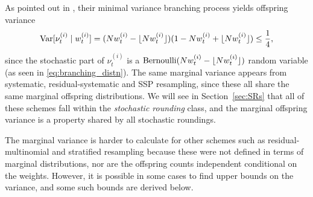 As pointed out in \textcite[p.557]{crisan1999}, their minimal variance branching process yields offspring variance
\begin{equation*}
\operatorname{Var}[ \nu_t^{(i)} \mid w_t^{(i)} ]
= ( Nw_t^{(i)} -\lfloor N w_t^{(i)} \rfloor )(1- Nw_t^{(i)} + \lfloor N w_t^{(i)} \rfloor) 
\leq \frac{1}{4} ,
\end{equation*}
since the stochastic part of $\nu_t^{(i)}$ is a $\operatorname{Bernoulli}( Nw_t^{(i)} -\lfloor N w_t^{(i)} \rfloor )$ random variable (as seen in \eqref{eq:branching_distn}).
The same marginal variance appears from systematic, residual-systematic and SSP resampling, since these all share the same marginal offspring distributions. We will see in Section~\ref{sec:SRs} that all of these schemes fall within the \emph{stochastic rounding} class, and the marginal offspring variance is a property shared by all stochastic roundings.

The marginal variance is harder to calculate for other schemes such as residual-multinomial and stratified resampling because these were not defined in terms of marginal distributions, nor are the offspring counts independent conditional on the weights.
However, it is possible in some cases to find upper bounds on the variance, and some such bounds are derived below.

